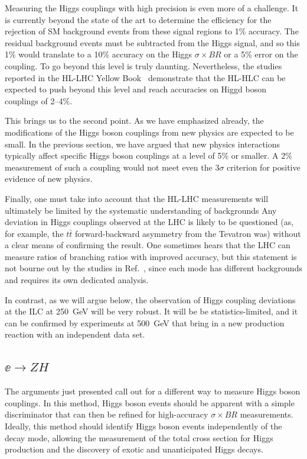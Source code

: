 Measuring  the Higgs couplings with high precision is even more of a challenge.   It is currently beyond the state of the art to determine the efficiency  for the rejection of SM background events from these signal regions to 1\% accuracy.   The residual background events must be subtracted from the Higgs signal, and so this 1\% would translate to a 10\% accuracy on the Higgs $\sigma\times BR$ or a 5\% error on the coupling. To go beyond this level is truly daunting.  Nevertheless, the studies reported in the HL-LHC Yellow Book~\cite{Cepeda:2019klc}  demonstrate that the HL-HLC can be expected to push beyond this level and reach accuracies on Higgd boson couplings of 2--4\%.

This brings us to the second point.  As we have emphasized already, the modifications of the Higgs boson couplings from new  physics are expected to be small.  In the previous section, we have argued that new physics interactions typically  affect specific
Higgs boson couplings at a level of 5\% or smaller.  A 2\% measurement of such a coupling  
would not meet even the $3\sigma$ criterion for positive evidence of new physics.

Finally, one must take into account that the HL-LHC measurements will ultimately be limited by the systematic understanding of backgrounds  Any deviation in Higgs couplings observed at the LHC is  likely to be questioned (as, for example, the $t\bar t$ forward-backward asymmetry from the Tevatron was) without a clear means of confirming the result. 
One sometimes hears that the LHC can measure ratios of branching ratios with improved accuracy, but this statement is not bourne out by the studies in Ref.~\cite{Cepeda:2019klc},  since each mode has different backgrounds and requires its own dedicated analysis. 

 In contrast, as we will argue below, the observation of Higgs coupling deviations at the ILC at  250~GeV will be very robust.  It will be be statistics-limited,  and it can be confirmed by experiments at 500~GeV that bring in a new production reaction with an independent  data set. 


\subsection{$\ee\to ZH$}

The arguments just presented call out for a different way to measure Higgs boson couplings.   In this method, Higgs boson events should be apparent with a simple discriminator that can then be refined for high-accuracy $\sigma\times BR$ measurements.  Ideally, this method should identify Higgs boson events independently of the decay mode, allowing the measurement of the total cross section for Higgs production and the discovery of exotic and unanticipated Higgs decays.

